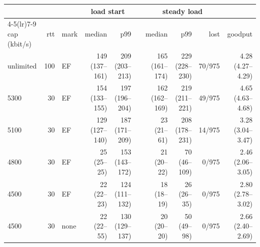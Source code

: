\begin{tabular}{lrl rrr rrr r}
\toprule
& & & \multicolumn{2}{c}{load start} & & \multicolumn{3}{c}{steady load} & \\
\cmidrule(lr){4-5}\cmidrule(lr){7-9}
cap (kbit/s) & rtt & mark & median & p99 & & median & p99 & lost & goodput \\
\midrule
unlimited & 100 & EF & 149 (137--161) & 209 (203--213) & & 165 (161--174) & 229 (228--230) & 70/975 & 4.28 (4.27--4.29) \\
5300 & 30 & EF & 154 (133--155) & 197 (196--204) & & 162 (162--169) & 219 (211--221) & 49/975 & 4.65 (4.63--4.68) \\
5100 & 30 & EF & 129 (127--140) & 187 (171--209) & & 23 (21--61) & 208 (178--231) & 14/975 & 3.28 (3.04--3.47) \\
4800 & 30 & EF & 25 (25--25) & 153 (143--172) & & 21 (20--22) & 70 (46--109) & 0/975 & 2.46 (2.06--3.05) \\
4500 & 30 & EF & 22 (22--23) & 124 (111--132) & & 18 (18--19) & 26 (26--35) & 0/975 & 2.80 (2.78--3.02) \\
4500 & 30 & none & 22 (22--55) & 130 (129--137) & & 20 (20--20) & 50 (49--98) & 0/975 & 2.66 (2.40--2.69) \\
\bottomrule
\end{tabular}